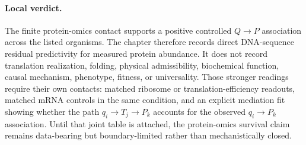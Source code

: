 \paragraph{Local verdict.}
The finite protein-omics contact supports a positive controlled $Q\to P$ association across the listed organisms.  The chapter therefore records direct DNA-sequence residual predictivity for measured protein abundance.  It does not record translation realization, folding, physical admissibility, biochemical function, causal mechanism, phenotype, fitness, or universality.  Those stronger readings require their own contacts: matched ribosome or translation-efficiency readouts, matched mRNA controls in the same condition, and an explicit mediation fit showing whether the path $q_i\to T_j\to P_k$ accounts for the observed $q_i\to P_k$ association.  Until that joint table is attached, the protein-omics survival claim remains data-bearing but boundary-limited rather than mechanistically closed.
